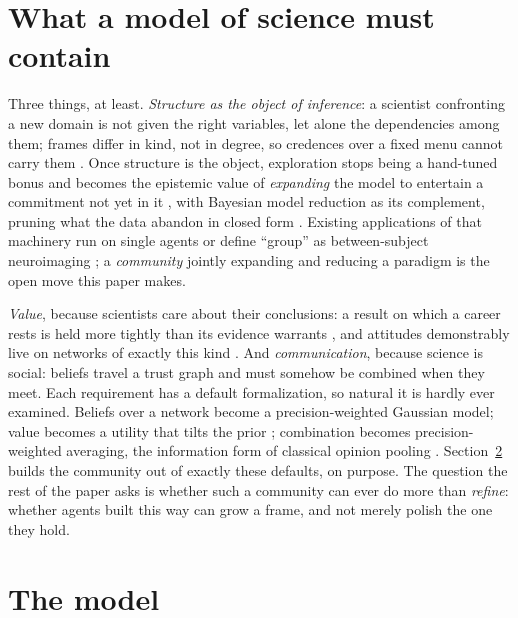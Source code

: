 \documentclass[runningheads]{llncs}
\begin{document}
\section{What a model of science must contain}
\label{sec:hidden}

Three things, at least. \emph{Structure as the object of inference}: a scientist confronting a
new domain is not given the right variables, let alone the dependencies among them; frames
differ in kind, not in degree, so credences over a fixed menu cannot carry them
\citep{ullman2020,kemp2008form,ullman2012}. Once structure is the object, exploration stops
being a hand-tuned bonus \citep{zollman2010,oconnor2019} and becomes the epistemic value of
\emph{expanding} the model to entertain a commitment not yet in it
\citep{friston2015,friston2017curiosity}, with Bayesian model reduction as its complement,
pruning what the data abandon in closed form \citep{friston2018bmr,neacsu2022}. Existing
applications of that machinery run on single agents \citep{neacsu2022,priorelli2023} or define
``group'' as between-subject neuroimaging \citep{friston2016peb}; a \emph{community} jointly
expanding and reducing a paradigm is the open move this paper makes.

\emph{Value}, because scientists care about their conclusions: a result on which a career rests
is held more tightly than its evidence warrants \citep{kitcher1990,strevens2003}, and attitudes
demonstrably live on networks of exactly this kind \citep{dalege2016}. And \emph{communication},
because science is social: beliefs travel a trust graph and must somehow be combined when they
meet. Each requirement has a default formalization, so natural it is hardly ever examined.
Beliefs over a network become a precision-weighted Gaussian model; value becomes a utility that
tilts the prior \citep{hyland2025}; combination becomes precision-weighted averaging, the
information form of classical opinion pooling \citep{degroot1974,genest1986}.
Section~\ref{sec:bmebmr} builds the community out of exactly these defaults, on purpose. The
question the rest of the paper asks is whether such a community can ever do more than
\emph{refine}: whether agents built this way can grow a frame, and not merely polish the one
they hold.

\section{The model}
\label{sec:bmebmr}
\end{document}
